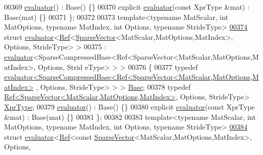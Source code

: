\begin{DoxyCode}
00369   \hyperlink{struct_eigen_1_1internal_1_1evaluator}{evaluator}() : Base() \{\}
00370   \textcolor{keyword}{explicit} \hyperlink{struct_eigen_1_1internal_1_1evaluator}{evaluator}(\textcolor{keyword}{const} XprType &mat) : Base(mat) \{\}
00371 \};
00372 
00373 \textcolor{keyword}{template}<\textcolor{keyword}{typename} MatScalar, \textcolor{keywordtype}{int} MatOptions, \textcolor{keyword}{typename} MatIndex, \textcolor{keywordtype}{int} Options, \textcolor{keyword}{typename} Str\textcolor{keywordtype}{id}eType>
\hyperlink{struct_eigen_1_1internal_1_1evaluator_3_01_ref_3_01_sparse_vector_3_01_mat_scalar_00_01_mat_optic924bcdf873ee6e467b0642118d17ceb}{00374} \textcolor{keyword}{struct }\hyperlink{struct_eigen_1_1internal_1_1evaluator}{evaluator}<\hyperlink{group___core___module_class_eigen_1_1_ref}{Ref}<\hyperlink{group___sparse_core___module_class_eigen_1_1_sparse_vector}{SparseVector}<MatScalar,MatOptions,MatIndex>, Options, 
      StrideType> >
00375   : \hyperlink{struct_eigen_1_1internal_1_1evaluator}{evaluator}<SparseCompressedBase<Ref<SparseVector<MatScalar,MatOptions,MatIndex>, Options, Strid
      eType> > >
00376 \{
00377   \textcolor{keyword}{typedef} 
      \hyperlink{struct_eigen_1_1internal_1_1evaluator}{evaluator<SparseCompressedBase<Ref<SparseVector<MatScalar,MatOptions,MatIndex>}
      , Options, StrideType> > > \hyperlink{struct_eigen_1_1internal_1_1evaluator}{Base};
00378   \textcolor{keyword}{typedef} \hyperlink{group___core___module_class_eigen_1_1_ref}{Ref<SparseVector<MatScalar,MatOptions,MatIndex>}, 
      Options, StrideType> \hyperlink{group___sparse_core___module_class_eigen_1_1_ref_3_01_sparse_vector_3_01_mat_scalar_00_01_mat_options_00_01_mat_index_01_4_00357b3c2eca55b7ce618d0a2b2447510f}{XprType};
00379   \hyperlink{struct_eigen_1_1internal_1_1evaluator}{evaluator}() : Base() \{\}
00380   \textcolor{keyword}{explicit} \hyperlink{struct_eigen_1_1internal_1_1evaluator}{evaluator}(\textcolor{keyword}{const} XprType &mat) : Base(mat) \{\}
00381 \};
00382 
00383 \textcolor{keyword}{template}<\textcolor{keyword}{typename} MatScalar, \textcolor{keywordtype}{int} MatOptions, \textcolor{keyword}{typename} MatIndex, \textcolor{keywordtype}{int} Options, \textcolor{keyword}{typename} Str\textcolor{keywordtype}{id}eType>
\hyperlink{struct_eigen_1_1internal_1_1evaluator_3_01_ref_3_01const_01_sparse_vector_3_01_mat_scalar_00_01_a519c1c897a6ea04f0cfeb49f9a37d05}{00384} \textcolor{keyword}{struct }\hyperlink{struct_eigen_1_1internal_1_1evaluator}{evaluator}<\hyperlink{group___core___module_class_eigen_1_1_ref}{Ref}<const \hyperlink{group___sparse_core___module_class_eigen_1_1_sparse_vector}{SparseVector}<MatScalar,MatOptions,MatIndex>, Options, 

\end{DoxyCode}
